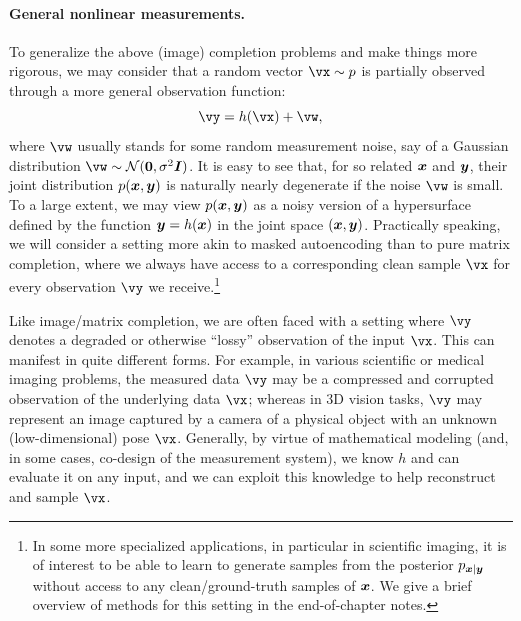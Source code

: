 \documentclass[../../book-main.tex]{subfiles}
\begin{document}
\paragraph{General nonlinear measurements.}
To generalize the above (image) completion problems and make things more rigorous, we may consider that a random vector $\vx \sim p$ is partially observed through a more
general observation function:
\begin{equation}\label{eq:measurement-matching-observation}
\vy = h(\vx) + \vw,
\end{equation}
where $\vw$ usually stands for some random measurement noise, say of
a Gaussian distribution $\vw \sim \mathcal{N}(\mathbf{0}, \sigma^2
\boldsymbol{I})$. It is easy to see that, for so related $\bm{x}$ and $\bm{y}$, their joint distribution $p(\bm{x}, \bm{y})$ is naturally nearly degenerate if the noise $\vw$ is small. To a large extent, we may view $p(\bm{x}, \bm{y})$ as a noisy version of a hypersurface defined by the function $\bm{y} = h(\bm{x})$ in the joint space $(\bm{x}, \bm{y})$.  Practically speaking, we will consider a setting more akin to masked autoencoding than to pure matrix completion, where we always have access to a corresponding clean sample $\vx$ for every observation $\vy$ we receive.\footnote{In some more specialized applications, in particular in scientific imaging, it is of interest to be able to learn to generate samples
from the posterior $p_{\bm{x} \mid \bm{y}}$ without access to any clean/ground-truth samples of $\bm{x}$. We give a brief overview of methods for this setting in the
end-of-chapter notes.}

Like image/matrix completion, we
are often faced with a setting where $\vy$ denotes a degraded or otherwise
``lossy''
observation of the input $\vx$. This can manifest in quite different
forms. For example, in various scientific or
medical imaging problems, the measured data $\vy$ may be a compressed and
corrupted observation of the underlying data $\vx$; whereas in 3D vision tasks,
$\vy$ may represent an image captured by a camera of a physical object with an
unknown (low-dimensional) pose $\vx$.
Generally, by virtue of mathematical modeling (and, in some cases, co-design
of the measurement system), we know $h$ and can evaluate it on any input, and
we can exploit this knowledge to help reconstruct and sample $\vx$.
\end{document}
